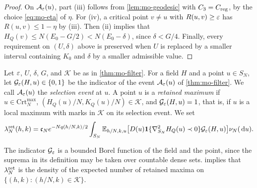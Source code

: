 \begin{proof}
On $\mathcal A_\varepsilon(u)$, part (iii) follows from \cref{lem:mo-geodesic} with $C_3=C_{\rm reg}$, by the choice \eqref{eq:mo-eta} of $\eta$. For (iv), a critical point $v\ne u$ with $R(u,v)\ge\varepsilon$ has $R(u,v)\le1-\eta$ by (iii). Then (ii) implies that $H_Q(v)\le N(E_0-G/2)<N(E_0-\delta)$, since $\delta<G/4$. Finally, every requirement on $(U,\delta)$ above is preserved when $U$ is replaced by a smaller interval containing $K_0$ and $\delta$ by a smaller admissible value.
\end{proof}

\begin{definition}\label{def:mo-retained}
Let $\varepsilon$, $U$, $\delta$, $G$, and $\mathcal K$ be as in \cref{thm:mo-filter}. For a field $H$ and a point $u\in S_N$, let $\mathcal G_\varepsilon(H,u)\in\{0,1\}$ be the indicator of the event $\mathcal A_\varepsilon(u)$ of \cref{thm:mo-filter}. We call $\mathcal A_\varepsilon(u)$ the \emph{selection event} at $u$. A point $u$ is a \emph{retained maximum} if $u\in\mathrm{Crt}_N^{\max}$, $(H_Q(u)/N,K_Q(u)/N)\in\mathcal K$, and $\mathcal G_\varepsilon(H,u)=1$, that is, if $u$ is a local maximum with marks in $\mathcal K$ on its selection event. We set
\begin{equation}\label{eq:mo-ret-intensity}
\lambda_N^{\rm ret}(h,k)=\mathfrak c_Ne^{-Nq(h/N,k)/2}\int_{S_N}\mathbb E_{h/N,k,u}\bigl[D(u)\mathbf 1\{\nabla_{S_N}^2H_Q(u)\prec0\}\mathcal G_\varepsilon(H,u)\bigr]\nu_N(\,\mathrm d u).
\end{equation}
\end{definition}

The indicator $\mathcal G_\varepsilon$ is a bounded Borel function of the field and the point, since the suprema in its definition may be taken over countable dense sets.  implies that $\lambda_N^{\rm ret}$ is the density of the expected number of retained maxima on $\{(h,k):(h/N,k)\in\mathcal K\}$.

